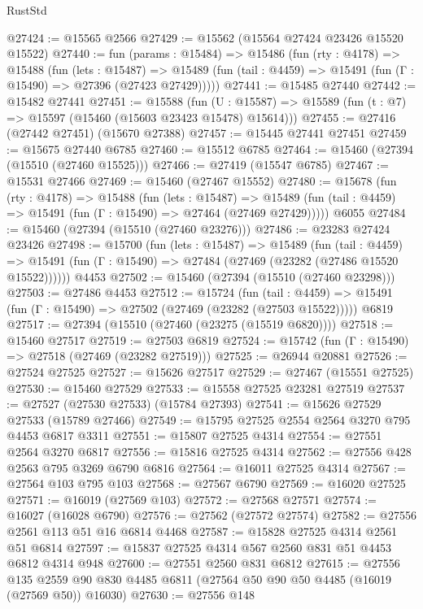 \begin{lexlean}{RustStd}
\begin{coremodule}
@27424 := @15565 @2566
@27429 := @15562 (@15564 @27424 @23426 @15520 @15522)
@27440 := fun (params : @15484) =>
  @15486
    (fun (rty : @4178) =>
    @15488
      (fun (lets : @15487) =>
      @15489 (fun (tail : @4459) => @15491 (fun (Γ : @15490) => @27396 (@27423 @27429)))))
@27441 := @15485 @27440
@27442 := @15482 @27441
@27451 := @15588
    (fun (U : @15587) => @15589 (fun (t : @7) => @15597 (@15460 (@15603 @23423 @15478) @15614)))
@27455 := @27416 (@27442 @27451) (@15670 @27388)
@27457 := @15445 @27441 @27451
@27459 := @15675 @27440 @6785
@27460 := @15512 @6785
@27464 := @15460 (@27394 (@15510 (@27460 @15525)))
@27466 := @27419 (@15547 @6785)
@27467 := @15531 @27466
@27469 := @15460 (@27467 @15552)
@27480 := @15678
    (fun (rty : @4178) =>
    @15488
      (fun (lets : @15487) =>
      @15489 (fun (tail : @4459) => @15491 (fun (Γ : @15490) => @27464 (@27469 @27429)))))
    @6055
@27484 := @15460 (@27394 (@15510 (@27460 @23276)))
@27486 := @23283 @27424 @23426
@27498 := @15700
    (fun (lets : @15487) =>
    @15489
      (fun (tail : @4459) =>
      @15491 (fun (Γ : @15490) => @27484 (@27469 (@23282 (@27486 @15520 @15522))))))
    @4453
@27502 := @15460 (@27394 (@15510 (@27460 @23298)))
@27503 := @27486 @4453
@27512 := @15724
    (fun (tail : @4459) => @15491 (fun (Γ : @15490) => @27502 (@27469 (@23282 (@27503 @15522)))))
    @6819
@27517 := @27394 (@15510 (@27460 (@23275 (@15519 @6820))))
@27518 := @15460 @27517
@27519 := @27503 @6819
@27524 := @15742 (fun (Γ : @15490) => @27518 (@27469 (@23282 @27519)))
@27525 := @26944 @20881
@27526 := @27524 @27525
@27527 := @15626 @27517
@27529 := @27467 (@15551 @27525)
@27530 := @15460 @27529
@27533 := @15558 @27525 @23281 @27519
@27537 := @27527 (@27530 @27533) (@15784 @27393)
@27541 := @15626 @27529 @27533 (@15789 @27466)
@27549 := @15795 @27525 @2554 @2564 @3270 @795 @4453 @6817 @3311
@27551 := @15807 @27525 @4314
@27554 := @27551 @2564 @3270 @6817
@27556 := @15816 @27525 @4314
@27562 := @27556 @428 @2563 @795 @3269 @6790 @6816
@27564 := @16011 @27525 @4314
@27567 := @27564 @103 @795 @103
@27568 := @27567 @6790
@27569 := @16020 @27525
@27571 := @16019 (@27569 @103)
@27572 := @27568 @27571
@27574 := @16027 (@16028 @6790)
@27576 := @27562 (@27572 @27574)
@27582 := @27556 @2561 @113 @51 @16 @6814 @4468
@27587 := @15828 @27525 @4314 @2561 @51 @6814
@27597 := @15837 @27525 @4314 @567 @2560 @831 @51 @4453 @6812 @4314 @948
@27600 := @27551 @2560 @831 @6812
@27615 := @27556
    @135
    @2559
    @90
    @830
    @4485
    @6811
    (@27564 @50 @90 @50 @4485 (@16019 (@27569 @50)) @16030)
@27630 := @27556
    @148

\end{coremodule}
\end{lexlean}
